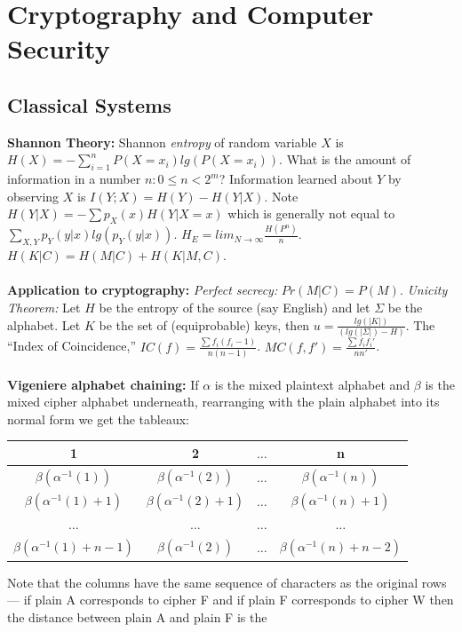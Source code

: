 \chapter{Cryptography and Computer Security}
\section{Classical Systems}
{\bf Shannon Theory: } Shannon \emph{entropy} of random variable $X$ is 
$H(X)= - \sum_{i=1}^n P(X=x_i) lg(P(X=x_i))$.
What is the amount of information in a number $n: 0 \le n <2^m$?  
Information learned about 
$Y$ by observing $X$ is $I(Y; X)= H(Y) - H(Y|X)$.  Note $H(Y|X)= -\sum p_X(x) H(Y|X=x)$ which
is generally not equal to $\sum_{X, Y} p_Y(y|x) lg(p_Y(y|x))$.
$H_E= lim_{N \rightarrow \infty} {\frac {H(P^n)} {n}}$.  $H(K|C)= H(M|C)+ H(K|M,C)$.
\\
\\
{\bf Application to cryptography: }
\emph{Perfect secrecy: } $Pr(M|C)=P(M)$.  
\emph{Unicity Theorem: }  Let $H$ be the entropy of the 
source (say English) and let $\Sigma$ be the alphabet.  
Let $K$ be the set of (equiprobable) keys, then $u= {\frac {lg(|K|)} {(lg(|\Sigma|)-H)}}$.
The ``Index of Coincidence,''
$IC(f)= {\frac {\sum {f_i(f_i-1)}} {n(n-1)}}$.
$MC(f, f')= {\frac {\sum {f_i f_{i}'}} {n n'}}$.
\\
\\
{\bf Vigeniere alphabet chaining: }  If $\alpha$ is the mixed plaintext alphabet and
$\beta$ is the mixed cipher alphabet underneath, rearranging with the plain alphabet into
its normal form we get the tableaux:
\begin{center}
\begin{tabular} {|c|c|c|c|}
\hline
1 & 2 & $\ldots$ & n\\
\hline
$\beta(\alpha^{-1}(1))$ & $\beta(\alpha^{-1}(2))$ & $\ldots$ & $\beta(\alpha^{-1}(n))$\\
$\beta(\alpha^{-1}(1)+1)$ & $\beta(\alpha^{-1}(2)+1)$ & $\ldots$ & $\beta(\alpha^{-1}(n)+1)$\\
$\ldots$ & $\ldots$ & $\ldots$ & $\ldots$\\
$\beta(\alpha^{-1}(1)+n-1)$ & $\beta(\alpha^{-1}(2))$ & $\ldots$ & $\beta(\alpha^{-1}(n)+n-2)$\\
\hline
\end{tabular}
\end{center}
Note that the columns have the same sequence of characters as the original rows ---
if plain A corresponds to cipher F and
if plain F corresponds to cipher W then the distance between plain A and plain F is the
